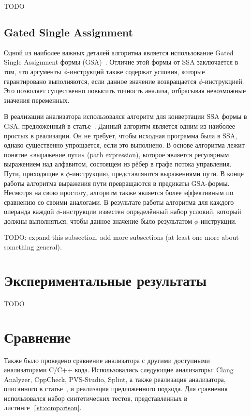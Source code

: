 TODO

\subsection{Gated Single Assignment}

Одной из наиболее важных деталей алгоритма является использование
Gated Single Assignment формы
(GSA)~\cite{ottenstein1990program}. Отличие этой формы от SSA
заключается в том, что аргументы $\phi$-инструкций также содержат
условия, которые гарантировано выполняются, если данное значение
возвращается $\phi$-инструкцией. Это позволяет существенно повысить
точность анализа, отбрасывая невозможные значения переменных.

В реализации анализатора использовался алгоритм для конвертации SSA
формы в GSA, предложенный в статье~\cite{tu1995efficient}. Данный
алгоритм является одним из наиболее простых в реализации. Он не
требует, чтобы исходная программа была в SSA, однако существенно
упрощается, если это выполнено. В основе алгоритма лежит понятие
«выражение пути» (path expression), которое является регулярным
выражением над алфавитом, состоящем из рёбер в графе потока
управления. Пути, приходящие в $\phi$-инструкцию, представляются
выражениями пути. В конце работы алгоритма выражения пути превращаются
в предикаты GSA-формы. Несмотря на свою простоту, алгоритм также
является более эффективным по сравнению со своими аналогами. В
результате работы алгоритма для каждого операнда каждой
$\phi$-инструкции известен определённый набор условий, который должны
выполняться, чтобы данное значение было результатом $\phi$-инструкции.

TODO: expand this subsection, add more subsections (at least one more
about something general).

\section{Экспериментальные результаты}

TODO

\section{Сравнение}

Также было проведено сравнение анализатора с другими доступными
анализаторами C/C++ кода. Использовались следующие анализаторы: Clang
Analyzer, CppCheck, PVS-Studio, Splint, а также реализация
анализатора, описанного в статье~\cite{li2010practical}, и реализация
предложенного подхода. Для сравнения использовался набор синтетических
тестов, представленных в листинге~\ref{lst:comparison}.

